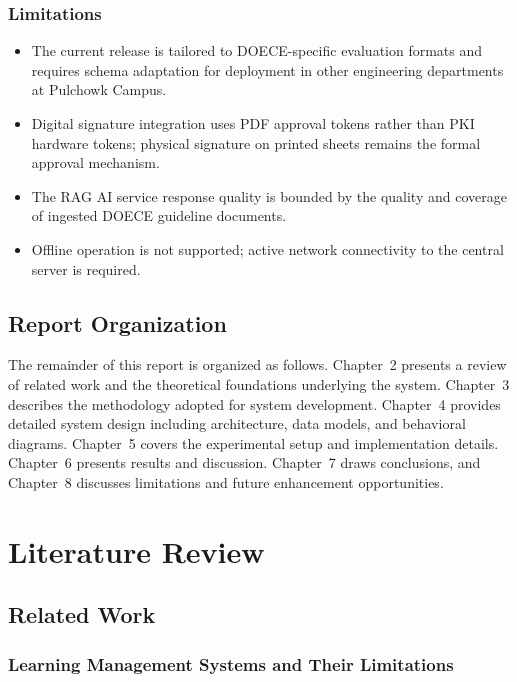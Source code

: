\documentclass[12pt]{report}
\begin{document}
\subsection{Limitations}

\begin{itemize}[leftmargin=*]
  \item The current release is tailored to DOECE-specific evaluation formats and requires schema adaptation for deployment in other engineering departments at Pulchowk Campus.
  \item Digital signature integration uses PDF approval tokens rather than PKI hardware tokens; physical signature on printed sheets remains the formal approval mechanism.
  \item The RAG AI service response quality is bounded by the quality and coverage of ingested DOECE guideline documents.
  \item Offline operation is not supported; active network connectivity to the central server is required.
\end{itemize}

\section{Report Organization}

The remainder of this report is organized as follows. Chapter~2 presents a review of related work and the theoretical foundations underlying the system. Chapter~3 describes the methodology adopted for system development. Chapter~4 provides detailed system design including architecture, data models, and behavioral diagrams. Chapter~5 covers the experimental setup and implementation details. Chapter~6 presents results and discussion. Chapter~7 draws conclusions, and Chapter~8 discusses limitations and future enhancement opportunities.

\chapter{Literature Review}

\section{Related Work}

\subsection{Learning Management Systems and Their Limitations}
\end{document}
